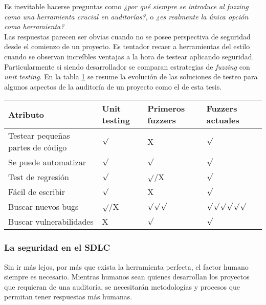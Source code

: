 Es inevitable hacerse preguntas como \textit{¿por qué siempre se introduce al fuzzing como una herramienta crucial en auditorías?}, o \textit{¿es realmente la única opción como herramienta?}\\

Las respuestas parecen ser obvias cuando no se posee perspectiva de seguridad desde el comienzo de un proyecto. Es tentador recaer a herramientas del estilo cuando se observan increíbles ventajas a la hora de testear aplicando seguridad. Particularmente si siendo desarrollador se comparan estrategias de \textit{fuzzing} con \textit{unit testing}. En la tabla \ref{tab:fuzzing} se resume la evolución de las soluciones de testeo para algunos aspectos de la auditoría de un proyecto como el de esta tesis. \\

\begin{table}
\begin{tabular}{|p{4.3cm}|p{3cm}|p{3cm}|p{3cm}|}
    \hline
    Atributo & \textbf{Unit testing} & \textbf{Primeros fuzzers} & \textbf{Fuzzers actuales} \\
    \hline
    Testear pequeñas partes de código & $\surd$ & X & $\surd$ \\
    \hline
    Se puede automatizar & $\surd$ & $\surd$ & $\surd$\\
    \hline
    Test de regresión & $\surd$ & $\surd$/X & $\surd$\\
    \hline
    Fácil de escribir & $\surd$ & X & $\surd$\\
    \hline
    Buscar nuevos bugs & $\surd$/X & $\surd$$\surd$$\surd$ & $\surd$$\surd$$\surd$$\surd$$\surd$$\surd$\\
    \hline
    Buscar vulnerabilidades & X & $\surd$ & $\surd$\\
    \hline
\end{tabular}
\label{tab:fuzzing}
\end{table}

\subsubsection{La seguridad en el SDLC}
Sin ir más lejos, por más que exista la herramienta perfecta, el factor humano siempre es necesario. Mientras humanos sean quienes desarrollan los proyectos que requieran de una auditoría, se necesitarán metodologías y procesos que permitan tener respuestas más humanas.\\

